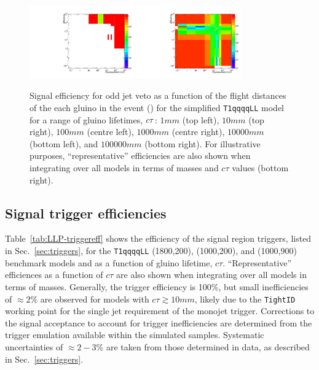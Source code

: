 \begin{figure}[h!]
\begin{center}
    \includegraphics[width=0.4\textwidth]{figures/LLPResults/systs/oddjetveto/Signal_SignalModels__longLivedAnalyzer__SMS-T1qqqqLL_ctau_100000_mGluino-1000_mLSP-200_25ns__eff_oddjet_2D_log_num.pdf} 
    \includegraphics[width=0.4\textwidth]{figures/LLPResults/systs/oddjetveto/Signal_SignalModels__longLivedAnalyzer__SMS_T1qqqqLL_ctau-all__eff_oddjet_2D_log_num.pdf} 
    \caption{Signal efficiency for odd jet veto as a function of the
      flight distances of the each gluino in the event
      () for the simplified
      \texttt{T1qqqqLL} model for a range of gluino lifetimes,
      $c\tau$: $1\unit{mm}$ (top left), $10\unit{mm}$ (top right),
      $100\unit{mm}$ (centre left), $1000\unit{mm}$ (centre right),
      $10000\unit{mm}$ (bottom left), and $100000\unit{mm}$ (bottom
      right). For illustrative purposes, ``representative''
      efficiencies are also shown when integrating over all models in
      terms of masses and $c\tau$ values (bottom right). }
    \label{fig:oddjetveto}
  \end{center}
\end{figure}

\clearpage
\subsection{Signal trigger efficiencies}
\label{app:LLP-trigger}

Table~\ref{tab:LLP-triggereff} shows the efficiency of the signal
region triggers, listed in Sec.~\ref{sec:triggers}, for the
\texttt{T1qqqqLL} (1800,200), (1000,200), and (1000,900) benchmark
models and as a function of gluino lifetime, $c\tau$.
``Representative'' efficiences as a function of $c\tau$ are also shown
when integrating over all models in terms of masses. Generally, the
trigger efficiency is 100\%, but small inefficiencies of
${\approx}2\%$ are observed for models with $c\tau \gtrsim
10\unit{mm}$, likely due to the \verb!TightID! working point for the
single jet requirement of the monojet trigger. Corrections to the
signal acceptance to account for trigger inefficiencies are determined
from the trigger emulation available within the simulated
samples. Systematic uncertainties of ${\approx}2-3\%$ are taken from
those determined in data, as described in Sec.~\ref{sec:triggers}.

